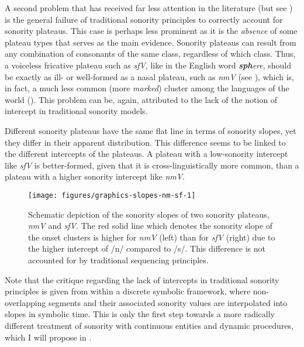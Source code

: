 A second problem that has received far less attention in the literature (but see \citealt{baroni2014language}) is the general failure of traditional sonority principles to correctly account for sonority plateaus.
This case is perhaps less prominent as it is the \emph{absence} of some plateau types that serves as the main evidence.
Sonority plateaus can result from any combination of consonants of the same class, regardless of which class. Thus, a voiceless fricative plateau such as \emph{sfV}, like in the English word \emph{\textbf{sph}ere}, should be exactly as ill- or well-formed as a nasal plateau, such as \emph{nmV} (see ), which is, in fact, a much less common (more \emph{marked}) cluster among the languages of the world (\citealt{greenberg1978some, kreitman2008phoneticssk, lindblom1983production}). This problem can be, again, attributed to the lack of 
the notion of 
intercept in traditional sonority models.

Different sonority plateaus have the same flat line in terms of sonority slopes, yet they differ in their apparent distribution. This difference seems to be linked to the different intercepts of the plateaus.
A plateau with a low-sonority intercept like \emph{sfV} is better-formed, given that it is cross-linguistically more common, than a plateau with a higher sonority intercept like \emph{nmV}.



\begin{figure}
\texttt{[image: figures/graphics-slopes-nm-sf-1]} 

\caption{Schematic depiction of the sonority slopes of two sonority plateaus, \emph{nmV} and \emph{sfV}. The red solid line which denotes the sonority slope of the onset clusters is higher for \emph{nmV} (left) than for \emph{sfV} (right) due to the higher intercept of /n/ compared to /s/. This difference is not accounted for by traditional sequencing principles.}\label{fig:slopes-nm-sf}
\end{figure}

Note that the critique regarding the lack of intercepts in traditional sonority principles is given from within a discrete symbolic framework, where non-overlapping segments and their associated sonority values are interpolated into slopes in symbolic time. This is only the first step towards a more radically different treatment of sonority with continuous entities and dynamic procedures, which I will propose in .

